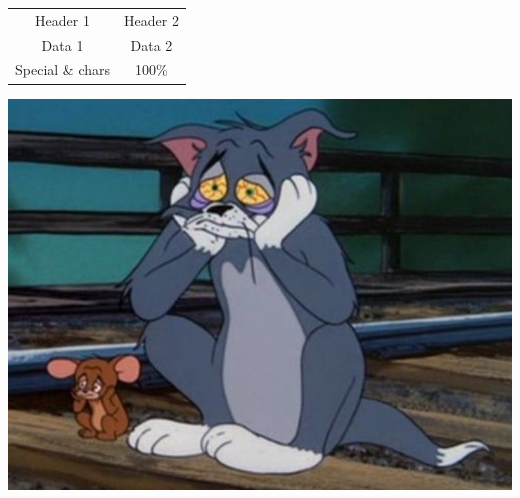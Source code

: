 \documentclass{article}
\begin{document}
\begin{tabular}{cc}
	Header 1 & Header 2 \\
	Data 1 & Data 2 \\
	Special \& chars & 100\% \\
\end{tabular}


\includegraphics{meme.png}
\end{document}
